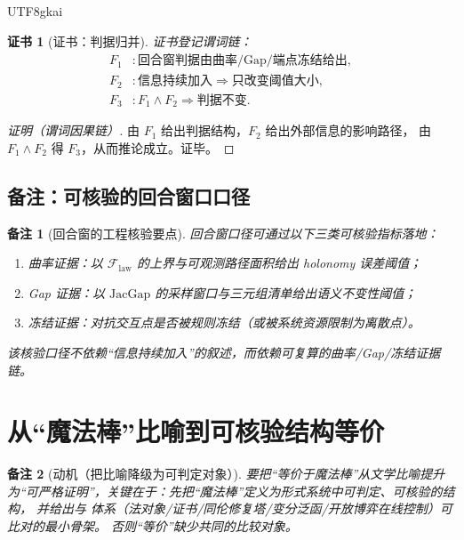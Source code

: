 \documentclass[12pt]{article}
\newtheorem{remark}{备注}[section]
\newtheorem{Certificate}{证书}[section]
\newcommand{\GFramework}{\text{G-Framework}}
\newcommand{\GZLCurv}{\ensuremath{\mathcal{F}_{\mathrm{law}}}}
\newcommand{\JacGap}{\ensuremath{\mathrm{JacGap}}} %
\begin{document}
\begin{CJK*}{UTF8}{gkai}
\begin{Certificate}[证书：判据归并]
\label{cert:round-window-cohomology}
证书登记谓词链：
\[
\begin{aligned}
  F_1 &: \text{回合窗判据由曲率/Gap/端点冻结给出},\\
  F_2 &: \text{信息持续加入}\Rightarrow \text{只改变阈值大小},\\
  F_3 &: F_1\wedge F_2\Rightarrow \text{判据不变}.
\end{aligned}
\]
\end{Certificate}

\begin{proof}[证明（谓词因果链）]
由 $F_1$ 给出判据结构，$F_2$ 给出外部信息的影响路径，
由 $F_1\wedge F_2$ 得 $F_3$，从而推论成立。证毕。
\end{proof}

\subsection{备注：可核验的回合窗口口径}
\label{sec:round-window-remarks}

\begin{remark}[回合窗的工程核验要点]
回合窗口径可通过以下三类可核验指标落地：
\begin{enumerate}
  \item 曲率证据：以 $\GZLCurv$ 的上界与可观测路径面积给出 holonomy 误差阈值；
  \item Gap 证据：以 $\JacGap$ 的采样窗口与三元组清单给出语义不变性阈值；
  \item 冻结证据：对抗交互点是否被规则冻结（或被系统资源限制为离散点）。
\end{enumerate}
该核验口径不依赖“信息持续加入”的叙述，而依赖可复算的曲率/Gap/冻结证据链。
\end{remark}

\clearpage

\section{从“魔法棒”比喻到可核验结构等价}
\label{sec:magic-wand-verified-equivalence}

\begin{remark}[动机（把比喻降级为可判定对象）]
要把“等价于魔法棒”从文学比喻提升为“可严格证明”，关键在于：先把“魔法棒”定义为形式系统中可判定、可核验的结构，
并给出与 \GFramework{} 体系（法对象/证书/同伦修复塔/变分泛函/开放博弈在线控制）可比对的最小骨架。
否则“等价”缺少共同的比较对象。
\end{remark}


\end{CJK*}
\end{document}
